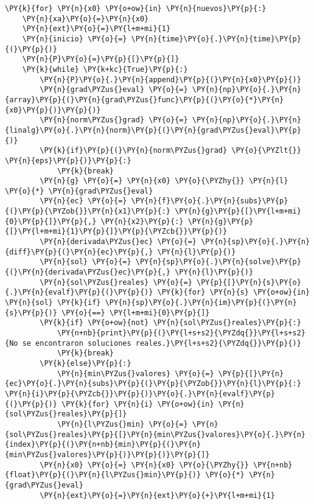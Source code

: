 \begin{itemize}
\begin{tcolorbox}[breakable, size=fbox, boxrule=1pt, pad at break*=1mm,colback=cellbackground, colframe=cellborder]
\begin{Verbatim}[commandchars=\\\{\}]
\PY{k}{for} \PY{n}{x0} \PY{o+ow}{in} \PY{n}{nuevos}\PY{p}{:}
    \PY{n}{xa}\PY{o}{=}\PY{n}{x0}
    \PY{n}{ext}\PY{o}{=}\PY{l+m+mi}{1}
    \PY{n}{inicio} \PY{o}{=} \PY{n}{time}\PY{o}{.}\PY{n}{time}\PY{p}{(}\PY{p}{)}
    \PY{n}{P}\PY{o}{=}\PY{p}{[}\PY{p}{]}
    \PY{k}{while} \PY{k+kc}{True}\PY{p}{:}
        \PY{n}{P}\PY{o}{.}\PY{n}{append}\PY{p}{(}\PY{n}{x0}\PY{p}{)}
        \PY{n}{grad\PYZus{}eval} \PY{o}{=} \PY{n}{np}\PY{o}{.}\PY{n}{array}\PY{p}{(}\PY{n}{grad\PYZus{}func}\PY{p}{(}\PY{o}{*}\PY{n}{x0}\PY{p}{)}\PY{p}{)}
        \PY{n}{norm\PYZus{}grad} \PY{o}{=} \PY{n}{np}\PY{o}{.}\PY{n}{linalg}\PY{o}{.}\PY{n}{norm}\PY{p}{(}\PY{n}{grad\PYZus{}eval}\PY{p}{)}
        \PY{k}{if}\PY{p}{(}\PY{n}{norm\PYZus{}grad} \PY{o}{\PYZlt{}} \PY{n}{eps}\PY{p}{)}\PY{p}{:}
            \PY{k}{break}
        \PY{n}{g} \PY{o}{=} \PY{n}{x0} \PY{o}{\PYZhy{}} \PY{n}{l} \PY{o}{*} \PY{n}{grad\PYZus{}eval}
        \PY{n}{ec} \PY{o}{=} \PY{n}{f}\PY{o}{.}\PY{n}{subs}\PY{p}{(}\PY{p}{\PYZob{}}\PY{n}{x1}\PY{p}{:} \PY{n}{g}\PY{p}{[}\PY{l+m+mi}{0}\PY{p}{]}\PY{p}{,} \PY{n}{x2}\PY{p}{:} \PY{n}{g}\PY{p}{[}\PY{l+m+mi}{1}\PY{p}{]}\PY{p}{\PYZcb{}}\PY{p}{)}    
        \PY{n}{derivada\PYZus{}ec} \PY{o}{=} \PY{n}{sp}\PY{o}{.}\PY{n}{diff}\PY{p}{(}\PY{n}{ec}\PY{p}{,} \PY{n}{l}\PY{p}{)}
        \PY{n}{sol} \PY{o}{=} \PY{n}{sp}\PY{o}{.}\PY{n}{solve}\PY{p}{(}\PY{n}{derivada\PYZus{}ec}\PY{p}{,} \PY{n}{l}\PY{p}{)}
        \PY{n}{sol\PYZus{}reales} \PY{o}{=} \PY{p}{[}\PY{n}{s}\PY{o}{.}\PY{n}{evalf}\PY{p}{(}\PY{p}{)} \PY{k}{for} \PY{n}{s} \PY{o+ow}{in} \PY{n}{sol} \PY{k}{if} \PY{n}{sp}\PY{o}{.}\PY{n}{im}\PY{p}{(}\PY{n}{s}\PY{p}{)} \PY{o}{==} \PY{l+m+mi}{0}\PY{p}{]}
        \PY{k}{if} \PY{o+ow}{not} \PY{n}{sol\PYZus{}reales}\PY{p}{:}
            \PY{n+nb}{print}\PY{p}{(}\PY{l+s+s2}{\PYZdq{}}\PY{l+s+s2}{No se encontraron soluciones reales.}\PY{l+s+s2}{\PYZdq{}}\PY{p}{)}
            \PY{k}{break}
        \PY{k}{else}\PY{p}{:}
            \PY{n}{min\PYZus{}valores} \PY{o}{=} \PY{p}{[}\PY{n}{ec}\PY{o}{.}\PY{n}{subs}\PY{p}{(}\PY{p}{\PYZob{}}\PY{n}{l}\PY{p}{:} \PY{n}{i}\PY{p}{\PYZcb{}}\PY{p}{)}\PY{o}{.}\PY{n}{evalf}\PY{p}{(}\PY{p}{)} \PY{k}{for} \PY{n}{i} \PY{o+ow}{in} \PY{n}{sol\PYZus{}reales}\PY{p}{]}
            \PY{n}{l\PYZus{}min} \PY{o}{=} \PY{n}{sol\PYZus{}reales}\PY{p}{[}\PY{n}{min\PYZus{}valores}\PY{o}{.}\PY{n}{index}\PY{p}{(}\PY{n+nb}{min}\PY{p}{(}\PY{n}{min\PYZus{}valores}\PY{p}{)}\PY{p}{)}\PY{p}{]}
        \PY{n}{x0} \PY{o}{=} \PY{n}{x0} \PY{o}{\PYZhy{}} \PY{n+nb}{float}\PY{p}{(}\PY{n}{l\PYZus{}min}\PY{p}{)} \PY{o}{*} \PY{n}{grad\PYZus{}eval}
        \PY{n}{ext}\PY{o}{=}\PY{n}{ext}\PY{o}{+}\PY{l+m+mi}{1}

\end{Verbatim}
\end{tcolorbox}
\end{itemize}
